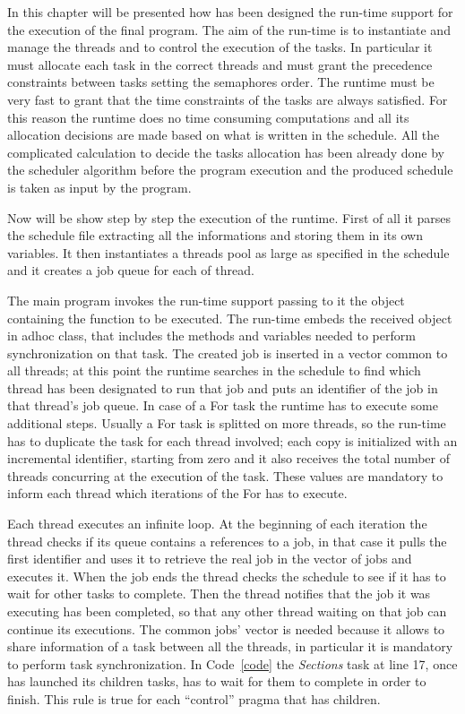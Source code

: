 \documentclass[a4paper,11pt,oneside]{book}
\begin{document}
In this chapter will be presented how has been designed the run-time support for the execution of the final program. The aim of the run-time is to instantiate and manage the threads and to control the execution of the tasks. In particular it must allocate each task in the correct threads and must grant the precedence constraints between tasks setting the semaphores order. The run\-time must be very fast to grant that the time constraints of the tasks are always satisfied. For this reason the run\-time does no time consuming computations and all its allocation decisions are made based on what is written in the schedule. All the complicated calculation to decide the tasks allocation has been already done by the scheduler algorithm before the program execution and the produced schedule is taken as input by the program. 

Now will be show step by step the execution of the run\-time. First of all it parses the schedule file extracting all the informations and storing them in its own variables. It then instantiates a threads pool as large as specified in the schedule and it creates a job queue for each of thread. 

The main program invokes the run-time support passing to it the object containing the function to be executed. The run-time embeds the received object in ad\-hoc class, that includes the methods and variables needed to perform synchronization on that task. The created job is inserted in a vector common to all threads; at this point the run\-time searches in the schedule to find which thread has been designated to run that job and puts an identifier of the job in that thread’s job queue. In case of a For task the run\-time has to execute some additional steps. Usually a For task is splitted on more threads, so the run-time has to duplicate the task for each thread involved; each copy is initialized with an incremental identifier, starting from zero and it also receives the total number of threads concurring at the execution of the task. These values are mandatory to inform each thread which iterations of the For has to execute. 

Each thread executes an infinite loop. At the beginning of each iteration the thread checks if its queue contains a references to a job, in that case it pulls the first identifier and uses it to retrieve the real job in the vector of jobs and executes it. When the job ends the thread checks the schedule to see if it has to wait for other tasks to complete. Then the thread notifies that the job it was executing has been completed, so that any other thread waiting on that job can continue its executions. The common jobs’ vector is needed because it allows to share information of a task between all the threads, in particular it is mandatory to perform task synchronization. In Code~\ref{code} the \emph{Sections} task at line 17, once has launched its children tasks, has to wait for them to complete in order to finish. This rule is true for each “control” pragma that has children. 
\end{document}

